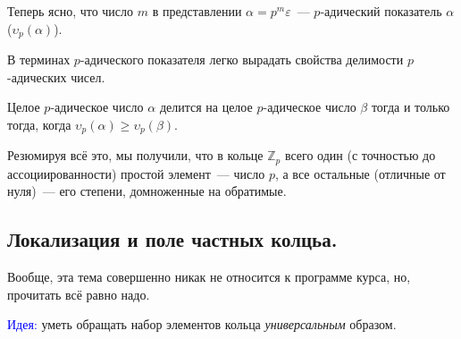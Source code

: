 \documentclass[11pt]{article}
\begin{document}
    Теперь ясно, что число $m$ в представлении $\alpha = p^m \varepsilon$~--- $p$-адический показатель $\alpha$ ($\upsilon_p(\alpha)$).

    В терминах $p$-адического показателя легко вырадать свойства делимости $p$-адических чисел.
    \begin{corollary}
        Целое $p$-адическое число $\alpha$ делится на целое $p$-адическое число $\beta$ тогда и только тогда, когда
        $\upsilon_p(\alpha) \ge \upsilon_p(\beta)$.
     \end{corollary}

    Резюмируя всё это, мы получили, что в кольце $\mathbb{Z}_p$ всего один (с точностью до ассоциированности) простой элемент~--- число $p$,
    а все остальные (отличные от нуля)~--- его степени, домноженные на обратимые.
    \subsection{Локализация и поле частных колцьа.}

    Вообще, эта тема совершенно никак не относится к программе курса, но, прочитать всё равно надо.

    \textcolor{blue}{Идея:} уметь обращать набор элементов кольца \emph{универсальным} образом. \\
\end{document}
